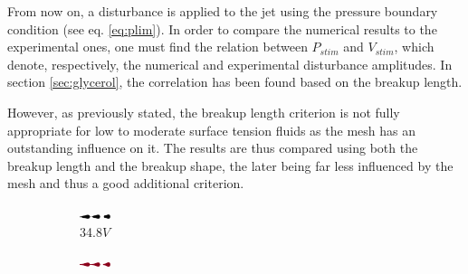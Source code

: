 \documentclass[onecolumn, 12pt]{asme2ej}
\begin{document}
From now on, a disturbance is applied to the jet using the pressure boundary condition (see eq. \ref{eq:plim}). In order to compare the numerical results to the experimental ones, one must find the relation between $P_{stim}$ and $V_{stim}$, which denote, respectively, the numerical and experimental disturbance amplitudes. In section \ref{sec:glycerol}, the correlation has been found based on the breakup length. 

However, as previously stated, the breakup length criterion is not fully appropriate for low to moderate surface tension fluids as the mesh has an outstanding influence on it. The results are thus compared using both the breakup length and the breakup shape, the later being far less influenced by the mesh and thus a good additional criterion.


\begin{figure}[h]

    \begin{subfigure}[t]{1.2cm}
        \centering
        \includegraphics[angle=-90,origin=c,width=0.9cm]{Figures/Fig14a.eps}        
        \caption{34.8$V$}
    \end{subfigure}
    \hfill
    \begin{subfigure}[t]{1.2cm}
        \centering
        \includegraphics[angle=-90,origin=c,width=0.9cm]{Figures/Fig14b.eps}


\end{subfigure}
\end{figure}
\end{document}
